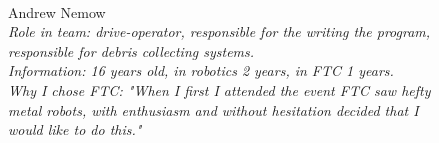 \begin{figure}[H]
	\begin{minipage}{0.47\linewidth}
		\\
	\end{minipage}
	\hfill
	\begin{minipage}{0.47\linewidth}
		Andrew Nemow\\
		\emph{Role in team: drive-operator, responsible for the writing the program, responsible for debris collecting systems.\\}
		\emph{Information: 16 years old, in robotics 2 years, in FTC 1 years.\\} 
		\emph{Why I chose FTC: "When I first I attended the event FTC saw hefty metal robots, with enthusiasm and without hesitation decided that I would like to do this."}				
	\end{minipage}
	\vfill
\end{figure}

